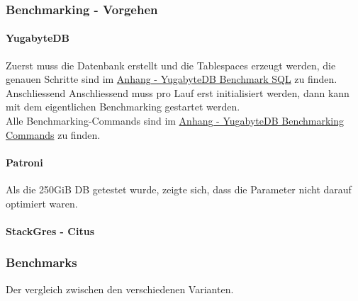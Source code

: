 
\begin{flushleft}
    \subsubsection{Benchmarking - Vorgehen}
    \paragraph{YugabyteDB}
    Zuerst muss die Datenbank erstellt und die Tablespaces erzeugt werden, die genauen Schritte sind im \hyperref[subsubsec:yugabytedb_benchmarking_sql]{Anhang - YugabyteDB Benchmark SQL} zu finden.\\    Anschliessend
    Anschliessend muss pro Lauf erst initialisiert werden, dann kann mit dem eigentlichen Benchmarking gestartet werden.\\
    Alle Benchmarking-Commands sind im \hyperref[subsec:yugabytedb_benchmarking_commands]{Anhang - YugabyteDB Benchmarking Commands} zu finden.
    \paragraph{Patroni}
    Als die 250GiB DB getestet wurde, zeigte sich, dass die Parameter nicht darauf optimiert waren.

    \paragraph{StackGres - Citus}

    \subsubsection{Benchmarks}
    Der vergleich zwischen den verschiedenen Varianten.\\
\end{flushleft}
\begin{flushleft}

\end{flushleft}
